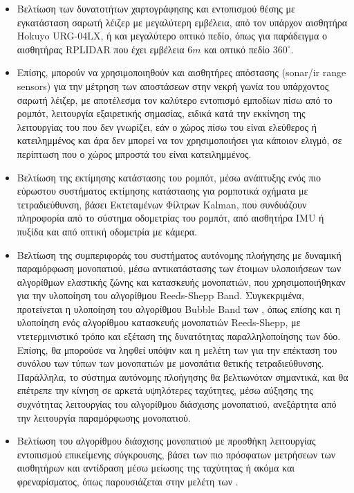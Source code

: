 \begin{itemize}
	\item Βελτίωση των δυνατοτήτων χαρτογράφησης και εντοπισμού θέσης με εγκατάσταση σαρωτή λέιζερ με μεγαλύτερη εμβέλεια, από τον υπάρχον αισθητήρα Hokuyo URG-04LX, ή και μεγαλύτερο οπτικό πεδίο, όπως για παράδειγμα ο αισθητήρας RPLIDAR που έχει εμβέλεια $6m$ και οπτικό πεδίο $360^\circ$.
	\item Επίσης, μπορούν να χρησιμοποιηθούν και αισθητήρες απόστασης (sonar/ir range sensors) για την μέτρηση των αποστάσεων στην νεκρή γωνία του υπάρχοντος σαρωτή λέιζερ, με αποτέλεσμα τον καλύτερο εντοπισμό εμποδίων πίσω από το ρομπότ, λειτουργία εξαιρετικής σημασίας, ειδικά κατά την εκκίνηση της λειτουργίας του που δεν γνωρίζει, εάν ο χώρος πίσω του είναι ελεύθερος ή κατειλημμένος και άρα δεν μπορεί να τον χρησιμοποιήσει για κάποιον ελιγμό, σε περίπτωση που ο χώρος μπροστά του είναι κατειλημμένος. 
	\item Βελτίωση της εκτίμησης κατάστασης του ρομπότ, μέσω ανάπτυξης ενός πιο εύρωστου συστήματος εκτίμησης κατάστασης για ρομποτικά οχήματα με τετραδιεύθυνση, βάσει Εκτεταμένων Φίλτρων Kalman, που συνδυάζουν πληροφορία από το σύστημα οδομετρίας του ρομπότ, από αισθητήρα IMU ή πυξίδα και από οπτική οδομετρία με κάμερα.
	\item Βελτίωση της συμπεριφοράς του συστήματος αυτόνομης πλοήγησης με δυναμική παραμόρφωση μονοπατιού, μέσω αντικατάστασης των έτοιμων υλοποιήσεων των αλγορίθμων ελαστικής ζώνης και κατασκευής μονοπατιών, που χρησιμοποιήθηκαν για την υλοποίηση του αλγορίθμου Reeds-Shepp Band. Συγκεκριμένα, προτείνεται η υλοποίηση του αλγορίθμου Bubble Band των \citeauthor{dpm} \cite{dpm}, όπως επίσης και η υλοποίηση ενός αλγορίθμου κατασκευής μονοπατιών Reeds-Shepp, με ντετερμινιστικό τρόπο και εξέταση της δυνατότητας παραλληλοποίησης των δύο. Επίσης, θα μπορούσε να ληφθεί υπόψιν και η μελέτη των \citeauthor{reeds_shepp_4ws} \cite{reeds_shepp_4ws} για την επέκταση του συνόλου των τύπων των μονοπατιών με μονοπάτια θετικής τετραδιεύθυνσης. Παράλληλα, το σύστημα αυτόνομης πλοήγησης θα βελτιωνόταν σημαντικά, και θα επέτρεπε την κίνηση σε αρκετά υψηλότερες ταχύτητες, μέσω αύξησης της συχνότητας λειτουργίας του αλγορίθμου διάσχισης μονοπατιού, ανεξάρτητα από την λειτουργία παραμόρφωσης μονοπατιού.
	\item Βελτίωση του αλγορίθμου διάσχισης μονοπατιού με προσθήκη λειτουργίας εντοπισμού επικείμενης σύγκρουσης, βάσει των πιο πρόσφατων μετρήσεων των αισθητήρων και αντίδραση μέσω μείωσης της ταχύτητας ή ακόμα και φρεναρίσματος, όπως παρουσιάζεται στην μελέτη των \citeauthor{reactive_fuzzy_ptc} \cite{reactive_fuzzy_ptc}.

\end{itemize}
